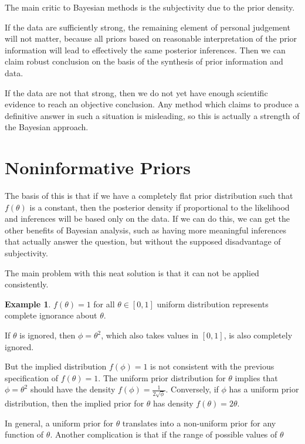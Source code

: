 \documentclass[lecture,12pt,]{pcms-l}
\numberwithin{section}{chapter}
\numberwithin{equation}{chapter}
\theoremstyle{plain}
\theoremstyle{definition}
\newtheorem{example}{Example}[section]
\theoremstyle{definition}
\begin{document}
The main critic to Bayesian methods is the subjectivity due to the prior density.

If the data are sufficiently strong, the remaining element of personal judgement will not matter, because all priors based on reasonable interpretation of the prior information will lead to effectively the same posterior inferences. Then we can claim robust conclusion on the basis of the synthesis of prior information and data.

If the data are not that strong, then we do not yet have enough scientific evidence to reach an objective conclusion. Any method which claims to produce a definitive answer in such a situation is misleading, so this is actually a strength of the Bayesian approach.

\section{Noninformative Priors}

The basis of this is that if we have a completely flat prior distribution such that $f(\theta)$ is a constant, then the posterior density if proportional to the likelihood and inferences will be based only on the data. If we can do this, we can get the other benefits of Bayesian analysis, such as having more meaningful inferences that actually answer the question, but without the  supposed disadvantage of subjectivity.

The main problem with this neat solution is that it can not be applied consistently.

\begin{example}
$f(\theta)=1$ for all $\theta \in \left [ 0, 1 \right ]$ uniform distribution represents complete ignorance about $\theta$.

If $\theta$ is ignored, then $\phi = \theta^2$, which also takes values in $\left [ 0, 1 \right ]$, is also completely ignored.

But the implied distribution $f(\phi)=1$ is not consistent with the previous specification of $f(\theta)=1$. The uniform prior distribution for $\theta$ implies that $\phi = \theta^2$ should have the density $f(\phi)=\frac{1}{2 \sqrt{\phi}}$. Conversely, if $\phi$ has a uniform prior distribution, then the implied prior for $\theta$ has density $f(\theta)=2 \theta$.

In general, a uniform prior for $\theta$ translates into a non-uniform prior for any function of $\theta$. Another complication is that if the range of possible values of $\theta$
\end{example}
\end{document}
